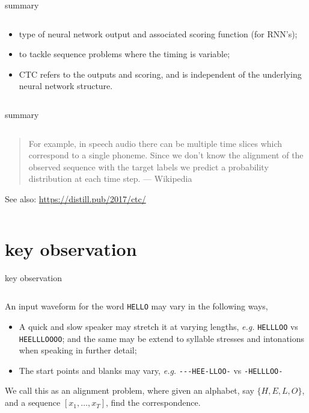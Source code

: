 \documentclass[aspectratio=169,xcolor={dvipsnames,svgnames}]{beamer}
\begin{document}
\begin{frame}[label={sec:org18f8691}]{summary}
\begin{columns}
\begin{column}{.7\columnwidth}
\begin{itemize}
\item type of neural network output and associated scoring
function (for RNN’s);
\item to tackle sequence problems where the timing is
variable;
\item CTC refers to the outputs and scoring, and is
independent of the underlying neural network
structure.
\end{itemize}
\end{column}
\end{columns}
\end{frame}
\begin{frame}[label={sec:org7ce3356}]{summary}
\begin{columns}
\begin{column}{.7\columnwidth}
\begin{quote}
For example, in speech audio there can be multiple time
slices which correspond to a single phoneme. Since we
don't know the alignment of the observed sequence with
the target labels we predict a probability distribution
at each time step. --- Wikipedia
\end{quote}

See also: \url{https://distill.pub/2017/ctc/}
\end{column}
\end{columns}
\end{frame}

\section{key observation}
\label{sec:org91d007b}
\begin{frame}[label={sec:org6a5f1ed},fragile]{key observation}
 \begin{columns}
\begin{column}{.7\columnwidth}
An input waveform for the word \texttt{HELLO} may vary in the
following ways,
\begin{itemize}
\item A quick and slow speaker may stretch it at varying
lengths, \emph{e.g.} \texttt{HELLLOO} vs \texttt{HEELLLOOOO}; and the
same may be extend to syllable stresses and
intonations when speaking in further detail;
\item The start points and blanks may vary, \emph{e.g.}
\texttt{-{}-{}-HEE-LLOO-} vs \texttt{-HELLLOO-}
\end{itemize}

We call this as an \alert{alignment} problem, where given an
alphabet, say \(\{H,E,L,O\}\), and a sequence
\([x_1,\ldots,x_T]\), find the correspondence.
\end{column}
\end{columns}
\end{frame}
\end{document}
